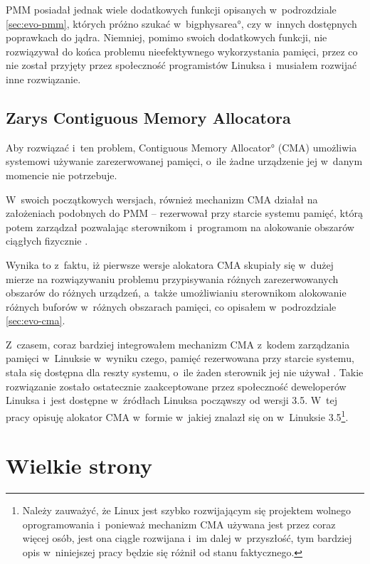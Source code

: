 PMM posiadał jednak wiele dodatkowych funkcji opisanych w~podrozdziale
\ref{sec:evo-pmm}, których próżno szukać w~\ang*{bigphysarea}, czy
w~innych dostępnych poprawkach do jądra.  Niemniej, pomimo swoich
dodatkowych funkcji, nie rozwiązywał do końca problemu nieefektywnego
wykorzystania pamięci, przez co nie został przyjęty przez społeczność
programistów Linuksa i~musiałem rozwijać inne rozwiązanie.

\subsection{Zarys Contiguous Memory Allocatora}

Aby rozwiązać i~ten problem, \ang*{Contiguous Memory Allocator} (CMA)
umożliwia systemowi używanie zarezerwowanej pamięci, o~ile żadne
urządzenie jej w~danym momencie nie potrzebuje.

W~swoich początkowych wersjach, również mechanizm CMA działał na
założeniach podobnych do PMM -- rezerwował przy starcie systemu
pamięć, którą potem zarządzał pozwalając sterownikom i~programom na
alokowanie obszarów ciągłych fizycznie \autocite{patch:cma-1}.

Wynika to z~faktu, iż pierwsze wersje alokatora CMA skupiały się
w~dużej mierze na rozwiązywaniu problemu przypisywania różnych
zarezerwowanych obszarów do różnych urządzeń, a~także umożliwianiu
sterownikom alokowanie różnych buforów w~różnych obszarach pamięci, co
opisałem w~podrozdziale \ref{sec:evo-cma}.

Z~czasem, coraz bardziej integrowałem mechanizm CMA z~kodem
zarządzania pamięci w~Linuksie w~wyniku czego, pamięć rezerwowana przy
starcie systemu, stała się dostępna dla reszty systemu, o~ile żaden
sterownik jej nie używał \autocite{patch:cma-24}.  Takie rozwiązanie
zostało ostatecznie zaakceptowane przez społeczność deweloperów
Linuksa i~jest dostępne w~źródłach Linuksa począwszy od wersji 3.5.
W~tej pracy opisuję alokator CMA w~formie w~jakiej znalazł się on
w~Linuksie 3.5\footnote{Należy zauważyć, że Linux jest szybko
  rozwijającym się projektem wolnego oprogramowania i~ponieważ
  mechanizm CMA używana jest przez coraz więcej osób, jest ona ciągle
  rozwijana i~im dalej w~przyszłość, tym bardziej opis w~niniejszej
  pracy będzie się różnił od stanu faktycznego.}.

\section{Wielkie strony}

